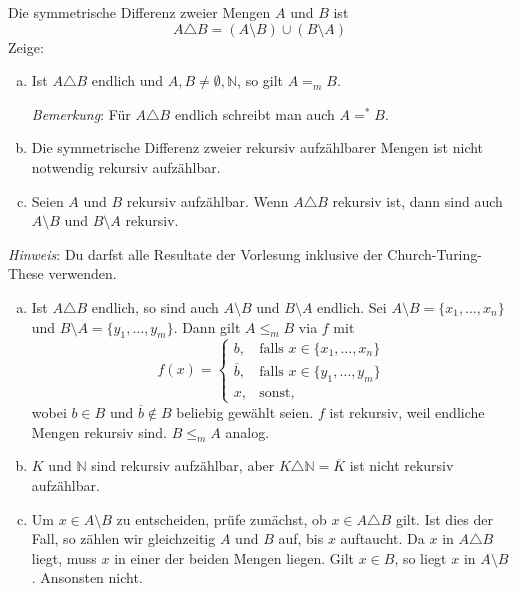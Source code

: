 \documentclass[german,headsepline]{scrartcl}
\begin{document}
	\begin{question}
		Die symmetrische Differenz zweier Mengen $A$ und $B$ ist
		\[A\triangle B=(A\setminus B)\cup(B\setminus A)\]
		Zeige:
		\begin{enumerate}[(a)]
			\item Ist $A\triangle B$ endlich und $A,B\neq\emptyset,\mathbb{N}$, so gilt $A=_mB$.
				
				\textit{Bemerkung}: Für $A\triangle B$ endlich schreibt man auch $A=^*B$.
			\item Die symmetrische Differenz zweier rekursiv aufzählbarer Mengen ist nicht notwendig rekursiv aufzählbar.
			\item Seien $A$ und $B$ rekursiv aufzählbar.
				Wenn $A\triangle B$ rekursiv ist, dann sind auch $A\setminus B$ und $B\setminus A$ rekursiv.
		\end{enumerate}
		\textit{Hinweis}: Du darfst alle Resultate der Vorlesung inklusive der Church-Turing-These verwenden.
	\end{question}
	\begin{solution}
		\begin{enumerate}[(a)]
			\item Ist $A\triangle B$ endlich, so sind auch $A\setminus B$ und $B\setminus A$ endlich.
				Sei $A\setminus B=\{x_1,\dots,x_n\}$ und $B\setminus A=\{y_1,\dots,y_m\}$.
				Dann gilt $A\leq_mB$ via $f$ mit
				\[f(x)=\begin{cases}
					b, &\text{falls }x\in\{x_1,\dots,x_n\} \\
					\overline{b}, &\text{falls }x\in\{y_1,\dots,y_m\} \\
					x, &\text{sonst,}
				\end{cases}\]
				wobei $b\in B$ und $\overline{b}\notin B$ beliebig gewählt seien.
				$f$ ist rekursiv, weil endliche Mengen rekursiv sind. $B\leq_mA$ analog.
			\item $K$ und $\mathbb{N}$ sind rekursiv aufzählbar,
				aber $K\triangle\mathbb{N}=\overline{K}$ ist nicht rekursiv aufzählbar.
			\item Um $x\in A\setminus B$ zu entscheiden, prüfe zunächst, ob $x\in A\triangle B$ gilt.
				Ist dies der Fall, so zählen wir gleichzeitig $A$ und $B$ auf, bis $x$ auftaucht.
				Da $x$ in $A\triangle B$ liegt, muss $x$ in einer der beiden Mengen liegen.
				Gilt $x\in B$, so liegt $x$ in $A\setminus B$. Ansonsten nicht.
		\end{enumerate}
	\end{solution}
	
\end{document}
